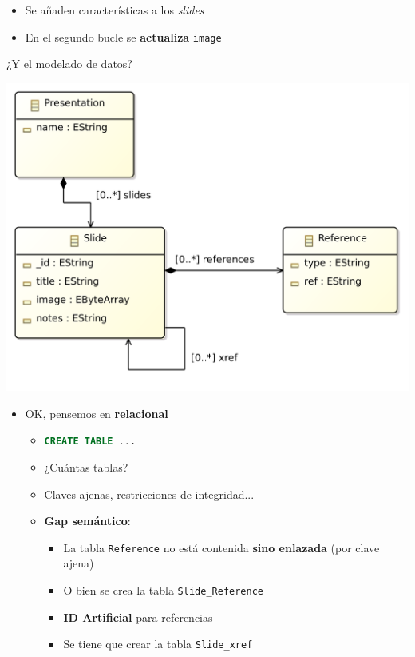 \documentclass[14pt]{beamer}
\begin{document}
\begin{frame}
\begin{itemize}
  \framebreak

\item Se añaden características a los {\em slides}
\item En el segundo bucle se {\bf actualiza} {\tt image}
\end{itemize}

\begin{alertblock}{¿Y el modelado de datos?}
\end{alertblock}

\framebreak

\centering\includegraphics[width=.9\textwidth]{img/slides-data-model}

\framebreak

\begin{itemize}
\item OK, pensemos en {\bf relacional}
  \begin{itemize}
  \item \lstinline[language=sql]{CREATE TABLE ...}
  \item ¿Cuántas tablas?
  \item Claves ajenas, restricciones de integridad...
  \item {\bf Gap semántico}:
    \begin{itemize}
    \item La tabla {\tt Reference} no está contenida {\bf sino enlazada}
      (por clave ajena)
    \item O bien se crea la tabla {\tt Slide\_Reference}
    \item {\bf ID Artificial} para referencias
    \item Se tiene que crear la tabla {\tt Slide\_xref}
    \end{itemize}
  \end{itemize}


\end{itemize}
\end{frame}
\end{document}
